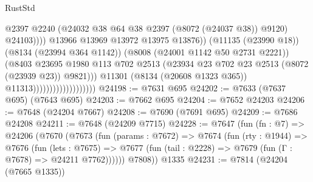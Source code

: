\begin{lexlean}{RustStd}
\begin{coremodule}
{\begin{coremodule}
{{{{{{{{{{{{{{{{{{{{{{{{{{{{{{{{{{{{{{{{{{{{{{{{{{{{{                                                        @2397
                                                        @2240
                                                        (@24032
                                                          @38
                                                          @64
                                                          @38
                                                          @2397
                                                          (@8072 (@24037 @38))
                                                          @9120)
                                                        @24103))))
                                                @13966
                                                @13969
                                                @13972
                                                @13975
                                                @13876))
                                            (@11135 (@23990 @18))
                                            (@8134 (@23994 @364 @1142))
                                            (@8008 (@24001 @1142 @50 @2731 @2221))
                                            (@8403
                                              @23695
                                              @1980
                                              @113
                                              @702
                                              @2513
                                              (@23934
                                                @23
                                                @702
                                                @23
                                                @2513
                                                (@8072 (@23939 @23))
                                                @9821)))
                                          @11301
                                          (@8134 (@20608 @1323 @365))
                                          @11313)))))))))))))))))))
@24198 := @7631 @695
@24202 := @7633 (@7637 @695) (@7643 @695)
@24203 := @7662 @695
@24204 := @7652 @24203
@24206 := @7648 (@24204 @7667)
@24208 := @7690 (@7691 @695)
@24209 := @7686 @24208
@24211 := @7648 (@24209 @7715)
@24228 := @7647
    (fun (fn : @7) =>
    @24206
      (@7670
        (@7673
          (fun (params : @7672) =>
          @7674
            (fun (rty : @1944) =>
            @7676
              (fun (lets : @7675) =>
              @7677 (fun (tail : @2228) => @7679 (fun (Γ : @7678) => @24211 @7762))))))
        @7808))
    @1335
@24231 := @7814 (@24204 (@7665 @1335))
}}}}}}}}}}}}}}}}}}}}}}}}}}}}}}}}}}}}}}}}}}}}}}}}}}}}}
\end{coremodule}}
\end{coremodule}
\end{lexlean}
